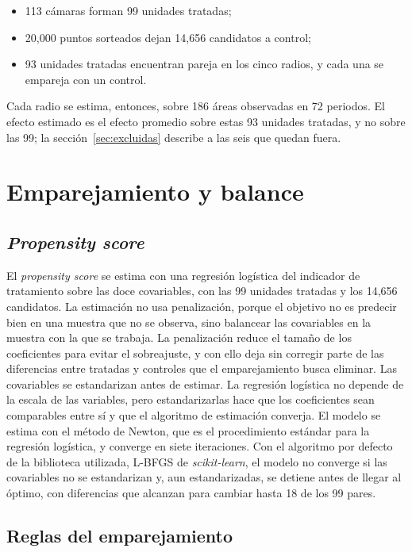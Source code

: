 \begin{itemize}
    \item 113 cámaras forman 99 unidades tratadas;
    \item 20,000 puntos sorteados dejan 14,656 candidatos a control;
    \item 93 unidades tratadas encuentran pareja en los cinco radios, y cada una se empareja con un control.
\end{itemize}

Cada radio se estima, entonces, sobre 186 áreas observadas en 72 periodos. El efecto estimado es el efecto promedio sobre estas 93 unidades tratadas, y no sobre las 99; la sección~\ref{sec:excluidas} describe a las seis que quedan fuera.

\section{Emparejamiento y balance}
\label{sec:emparejamiento}

\subsection{\emph{Propensity score}}

\noindent El \emph{propensity score} se estima con una regresión logística del indicador de tratamiento sobre las doce covariables, con las 99 unidades tratadas y los 14,656 candidatos. La estimación no usa penalización, porque el objetivo no es predecir bien en una muestra que no se observa, sino balancear las covariables en la muestra con la que se trabaja. La penalización reduce el tamaño de los coeficientes para evitar el sobreajuste, y con ello deja sin corregir parte de las diferencias entre tratadas y controles que el emparejamiento busca eliminar. Las covariables se estandarizan antes de estimar. La regresión logística no depende de la escala de las variables, pero estandarizarlas hace que los coeficientes sean comparables entre sí y que el algoritmo de estimación converja. El modelo se estima con el método de Newton, que es el procedimiento estándar para la regresión logística, y converge en siete iteraciones. Con el algoritmo por defecto de la biblioteca utilizada, L-BFGS de \emph{scikit-learn}, el modelo no converge si las covariables no se estandarizan y, aun estandarizadas, se detiene antes de llegar al óptimo, con diferencias que alcanzan para cambiar hasta 18 de los 99 pares.

\subsection{Reglas del emparejamiento}

